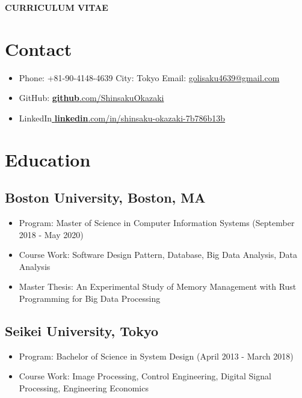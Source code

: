 \thispagestyle{empty}


\begin{center}
{\LARGE {\bf CURRICULUM VITAE}}\\
\vspace{0.5in}
\end{center}

\setcounter{section}{0}
\renewcommand*{\theHsection}{chX.\the\value{section}}

\section*{Contact}
\begin{itemize}
    \item Phone: +81-90-4148-4639 \textbullet{} City: Tokyo \textbullet{} Email: \href{golisaku4639@gmail.com}{golisaku4639@gmail.com} 
    \item GitHub: \href{https://github.com/ShinsakuOkazaki}{\textbf{github}.com/ShinsakuOkazaki} 
    \item LinkedIn\href{https://www.linkedin.com/in/shinsaku-okazaki-7b786b13b}{ \textbf{linkedin}.com/in/shinsaku-okazaki-7b786b13b}
\end{itemize}

\section*{Education}
\subsection*{Boston University, Boston, MA}
\begin{itemize}
    \item Program: Master of Science in Computer Information Systems (September 2018 - May 2020)
    \item Course Work: Software Design Pattern, Database, Big Data Analysis, Data Analysis
    \item Master Thesis: An Experimental Study of Memory Management with Rust Programming for Big Data Processing
\end{itemize}

\subsection*{Seikei University, Tokyo}
\begin{itemize}
    \item Program: Bachelor of Science in System Design (April 2013 - March 2018)
    \item Course Work: Image Processing, Control Engineering, Digital Signal Processing, Engineering Economics
\end{itemize}


